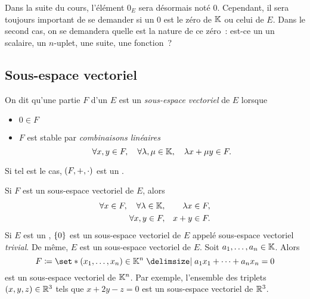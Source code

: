 \documentclass{magnolia}
\begin{document}





Dans la suite du cours, l'élément $0_E$ sera désormais noté $0$. Cependant, il sera
toujours important de se demander si un $0$ est le zéro de $\mathbb{K}$ ou celui de $E$. Dans
le second cas, on se demandera quelle est la nature de ce zéro~:
est-ce un un scalaire, un $n$-uplet, une suite, une fonction~?

\subsection{Sous-espace vectoriel}

\begin{definition}[utile=-3]
On dit qu'une partie $F$ d'un \Kev $E$ est un \emph{sous-espace vectoriel} de $E$
lorsque
\begin{itemize}
\item $0\in F$
\item $F$ est stable par \emph{combinaisons linéaires}
  \[\forall x,y\in F ,\quad \forall \lambda,\mu\in\mathbb{K} ,\quad
    \lambda x+\mu y\in F.\]
\end{itemize}
Si tel est le cas, $\left(F,+,\cdot\right)$ est un \Kev.
\end{definition}

\begin{remarques}
\remarque Si $F$ est un sous-espace vectoriel de $E$, alors
  \begin{eqnarray*}
\forall x\in F,\quad \forall \lambda\in\mathbb{K},& & \lambda x\in F,\\
\forall x,y\in F,& & x+y \in F.
	\end{eqnarray*}
\remarque[utile=-3] Si $E$ est un \Kev, $\left\{0\right\}$ est un sous-espace vectoriel de $E$
  appelé sous-espace vectoriel \emph{trivial}. De même, $E$ est un sous-espace vectoriel de
	$E$.
\remarque[utile=-2] Soit $a_1,\ldots,a_n\in\mathbb{K}$. Alors
  \[F\defeq\enstq{(x_1,\ldots,x_n)\in\K^n}{a_1 x_1+\cdots+a_n x_n=0}\]
  est un sous-espace vectoriel de $\mathbb{K}^n$. Par exemple, l'ensemble des triplets $(x,y,z)\in\mathbb{R}^3$ tels que
  $x+2y-z=0$ est un sous-espace vectoriel de $\mathbb{R}^3$.
\end{remarques}
\end{document}
